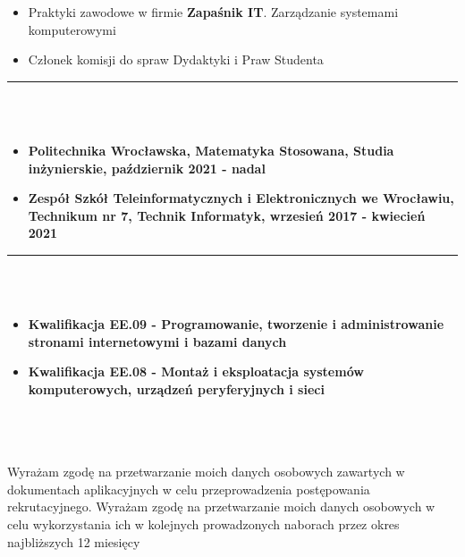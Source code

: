 \documentclass[10pt]{article}
\begin{document}
\begin{minipage}[t]{0.60\textwidth}
\begin{itemize}[leftmargin=*]
            \item Praktyki zawodowe w firmie \textbf{Zapaśnik IT}. Zarządzanie systemami  \\komputerowymi
            \item Członek komisji do spraw Dydaktyki i Praw Studenta
        \end{itemize}
        \rule{11cm}{1pt} \\ \\
        \fontsize{10pt}{10pt}
        \begin{itemize}[leftmargin=*]
            \setlength{\parskip}{0pt}
            \item \textbf{Politechnika Wrocławska, Matematyka Stosowana, Studia \\ inżynierskie, październik 2021 - nadal}
            \item \textbf{Zespół Szkół Teleinformatycznych i Elektronicznych we Wrocławiu, Technikum nr 7, Technik Informatyk, wrzesień 2017 - kwiecień 2021} 
        \end{itemize}
        \rule{11cm}{1pt} \\ \\
        \fontsize{10pt}{10pt}
        \begin{itemize}[leftmargin=*]
            \setlength{\parskip}{0pt}
            \item \textbf{Kwalifikacja EE.09 - Programowanie, tworzenie i administrowanie stronami
            internetowymi i bazami danych}
            \item \textbf{Kwalifikacja EE.08 - Montaż i eksploatacja systemów komputerowych, urządzeń
            peryferyjnych i sieci}
        \end{itemize}
        \rule{0pt}{0pt} \\ \\ \\
        \fontsize{7pt}{5pt}\selectfont  
        Wyrażam zgodę na przetwarzanie moich danych osobowych zawartych w dokumentach aplikacyjnych w
        celu przeprowadzenia postępowania rekrutacyjnego.
        Wyrażam zgodę na przetwarzanie moich danych osobowych w celu wykorzystania ich w kolejnych
        prowadzonych naborach przez okres najbliższych 12 miesięcy
    \end{minipage}
\end{document}
